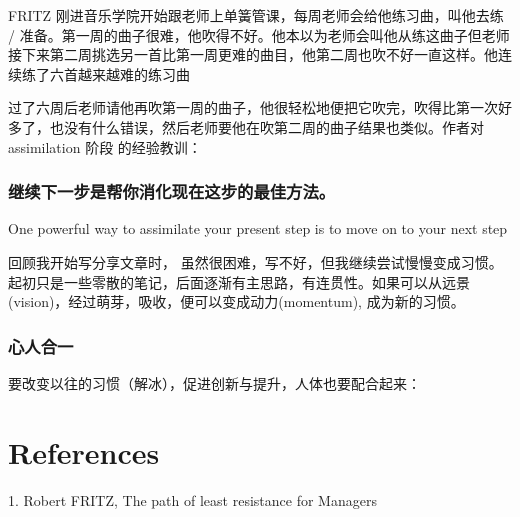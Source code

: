 FRITZ 刚进音乐学院开始跟老师上单簧管课，每周老师会给他练习曲，叫他去练 /
准备。第一周的曲子很难，他吹得不好。他本以为老师会叫他从练这曲子但老师接下来第二周挑选另一首比第一周更难的曲目，他第二周也吹不好一直这样。他连续练了六首越来越难的练习曲

过了六周后老师请他再吹第一周的曲子，他很轻松地便把它吹完，吹得比第一次好多了，也没有什么错误，然后老师要他在吹第二周的曲子结果也类似。作者对
assimilation 阶段 的经验教训：

\hypertarget{ux7ee7ux7eedux4e0bux4e00ux6b65ux662fux5e2eux4f60ux6d88ux5316ux73b0ux5728ux8fd9ux6b65ux7684ux6700ux4f73ux65b9ux6cd5}{%
\subsubsection{继续下一步是帮你消化现在这步的最佳方法。}\label{ux7ee7ux7eedux4e0bux4e00ux6b65ux662fux5e2eux4f60ux6d88ux5316ux73b0ux5728ux8fd9ux6b65ux7684ux6700ux4f73ux65b9ux6cd5}}

One powerful way to assimilate your present step is to move on to your
next step

回顾我开始写分享文章时，
虽然很困难，写不好，但我继续尝试慢慢变成习惯。起初只是一些零散的笔记，后面逐渐有主思路，有连贯性。如果可以从远景(vision)，经过萌芽，吸收，便可以变成动力(momentum),
成为新的习惯。

\hypertarget{ux5fc3ux4ebaux5408ux4e00}{%
\subsubsection{心人合一}\label{ux5fc3ux4ebaux5408ux4e00}}

要改变以往的习惯（解冰），促进创新与提升，人体也要配合起来：



\hypertarget{references}{%
\section{References}\label{references}}

1. Robert FRITZ, The path of least resistance for Managers\\
